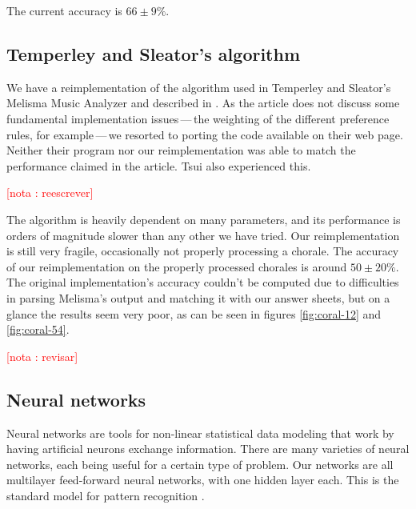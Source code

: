 \documentclass{article}
\newcounter{notacounter}
\newcommand{\nota}[1]{
  \addtocounter{notacounter}{1}
  \textcolor{red}{[nota \arabic{notacounter}: #1]}
}
\begin{document}
The current accuracy is $66 \pm 9\%$.

\subsection{Temperley and Sleator's algorithm}
\label{sec:temperley}

We have a reimplementation of the algorithm used in Temperley and
Sleator's Melisma Music Analyzer and described in
\cite{temperley.ea:modeling}. As the article does not discuss some
fundamental implementation issues\,---\,the weighting of the different
preference rules, for example\,---\,we resorted to porting the code
available on their web page. Neither their program nor our
reimplementation was able to match the performance claimed in the
article. Tsui \cite{tsui:harmonic} also experienced this. \nota{reescrever}

The algorithm is heavily dependent on many parameters, and its
performance is orders of magnitude slower than any other we have
tried. Our reimplementation is still very fragile, occasionally not
properly processing a chorale. The accuracy of our reimplementation on
the properly processed chorales is around $50 \pm 20\%$. The original
implementation's accuracy couldn't be computed due to difficulties in
parsing Melisma's output and matching it with our answer sheets, but on
a glance the results seem very poor, as can be seen in figures
\ref{fig:coral-12} and \ref{fig:coral-54}. \nota{revisar}

\subsection{Neural networks}
\label{sec:neural-nets}

Neural networks are tools for non-linear statistical data
modeling that work by having artificial neurons exchange
information. There are many varieties of neural networks, each being
useful for a certain type of problem. Our networks are all multilayer
feed-forward neural networks, with one hidden layer each. This is the
standard model for pattern recognition \cite{russell.ea:artificial}.
\end{document}
